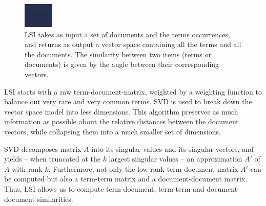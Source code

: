 \begin{figure}[htb]
\begin{center}
\includegraphics[width=.8\columnwidth]{lsi}
\caption{LSI takes as input a set of documents and the terms occurrences, and returns as output a vector space containing all the terms and all the documents. The similarity between two items (\ie terms or documents) is given by the angle between their corresponding vectors.}
\label{fig:lsi}
\end{center}
\end{figure}

LSI starts with a raw term-document-matrix, weighted by a weighting function to balance out very rare and very common terms. SVD is used to break down the vector space model into less dimensions. This algorithm preserves as much information as possible about the relative distances between the document vectors, while collapsing them into a much smaller set of dimensions.

SVD decomposes matrix $A$ into its singular values and its singular vectors, and yields -- when truncated at the $k$ largest singular values -- an approximation $A'$ of $A$ with rank $k$. Furthermore, not only the low-rank term-document matrix $A'$ can be computed but also a term-term matrix and a document-document matrix. Thus, LSI allows us to compute term-document, term-term and document-document similarities.

